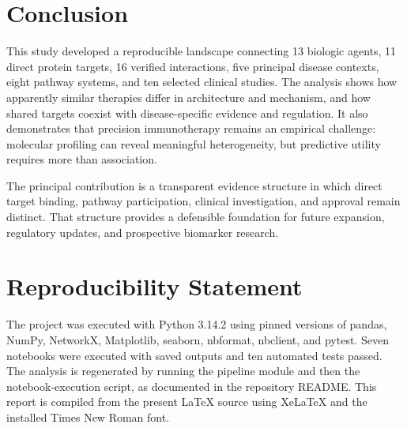 \documentclass[12pt,a4paper]{article}
\begin{document}
\section{Conclusion}
This study developed a reproducible landscape connecting 13 biologic agents, 11 direct protein targets, 16 verified interactions, five principal disease contexts, eight pathway systems, and ten selected clinical studies. The analysis shows how apparently similar therapies differ in architecture and mechanism, and how shared targets coexist with disease-specific evidence and regulation. It also demonstrates that precision immunotherapy remains an empirical challenge: molecular profiling can reveal meaningful heterogeneity, but predictive utility requires more than association.

The principal contribution is a transparent evidence structure in which direct target binding, pathway participation, clinical investigation, and approval remain distinct. That structure provides a defensible foundation for future expansion, regulatory updates, and prospective biomarker research.

\section*{Reproducibility Statement}
The project was executed with Python 3.14.2 using pinned versions of pandas, NumPy, NetworkX, Matplotlib, seaborn, nbformat, nbclient, and pytest. Seven notebooks were executed with saved outputs and ten automated tests passed. The analysis is regenerated by running the pipeline module and then the notebook-execution script, as documented in the repository README. This report is compiled from the present \LaTeX{} source using XeLaTeX and the installed Times New Roman font.
\end{document}
